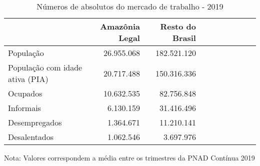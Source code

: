 \begin{table}[H]
\centering
\label{\_retrato\_emprego\_caracterizacao\_table}
\begin{threeparttable}
\caption{Números de absolutos do mercado de trabalho - 2019}
\begin{tabular}{l*{3}{rrr}}
\midrule \midrule
                    &Amazônia Legal&Resto do Brasil\\
\midrule
População         &  26.955.068& 182.521.120\\
População com idade ativa (PIA)&  20.717.488& 150.316.336\\
Ocupados            &  10.632.535&  82.756.848\\
Informais           &   6.130.159&  31.416.496\\
Desempregados       &   1.364.671&  11.210.141\\
Desalentados        &   1.062.546&   3.697.976\\
\bottomrule
\end{tabular}
\begin{tablenotes}
\scriptsize{Nota: Valores correspondem a média entre os trimestres da PNAD Contínua 2019}
\end{tablenotes}
\end{threeparttable}
\end{table}
